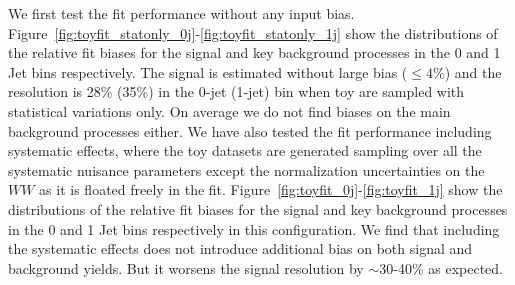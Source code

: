 We first test the fit performance without any input bias. 
Figure~\ref{fig:toyfit_statonly_0j}-\ref{fig:toyfit_statonly_1j} show the distributions of the relative fit biases 
for the signal and key background processes in the 0 and 1 Jet bins respectively. 
The signal is estimated without large bias ($\leq 4$\%) and the resolution is 28\% (35\%) in the 0-jet (1-jet) bin 
when toy are sampled with statistical variations only. 
On average we do not find biases on the main background processes either. 
We have also tested the fit performance including systematic effects, where the 
toy datasets are generated sampling over all the systematic nuisance parameters except the normalization 
uncertainties on the $WW$ as it is floated freely in the fit. 
Figure~\ref{fig:toyfit_0j}-\ref{fig:toyfit_1j} show the distributions of the relative fit biases 
for the signal and key background processes in the 0 and 1 Jet bins respectively in this configuration.  
We find that including the systematic effects does not introduce additional bias on both 
signal and background yields. But it worsens the signal resolution by $\sim$30-40\% as expected.  


